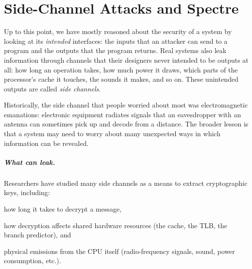 \chapter{Side-Channel Attacks and Spectre}
\label{chap:sidechannels}

Up to this point, we have mostly reasoned about the security of a
system by looking at its \emph{intended} interfaces: the inputs that
an attacker can send to a program and the outputs that the program
returns.
Real systems also leak information through channels that their
designers never intended to be outputs at all: how long an operation
takes, how much power it draws, which parts of the processor's cache it
touches, the sounds it makes, and so on.
These unintended outputs are called \emph{side channels}.

Historically, the side channel that people worried about most was
electromagnetic emanations: electronic equipment radiates
signals that an eavesdropper with an antenna can sometimes pick up and
decode from a distance.\autocite{nsa:tempest}
The broader lesson is that a system may need to worry about many
unexpected ways in which information can be revealed.

\paragraph{What can leak.}
Researchers have studied many side channels as a means to extract
cryptographic keys, including:
\begin{compactitem}
  \item how long it takes to decrypt a message,
  \item how decryption affects shared hardware resources
        (the cache, the TLB, the branch predictor), and
  \item physical emissions from the CPU itself (radio-frequency signals,
        sound, power consumption, etc.).
\end{compactitem}

